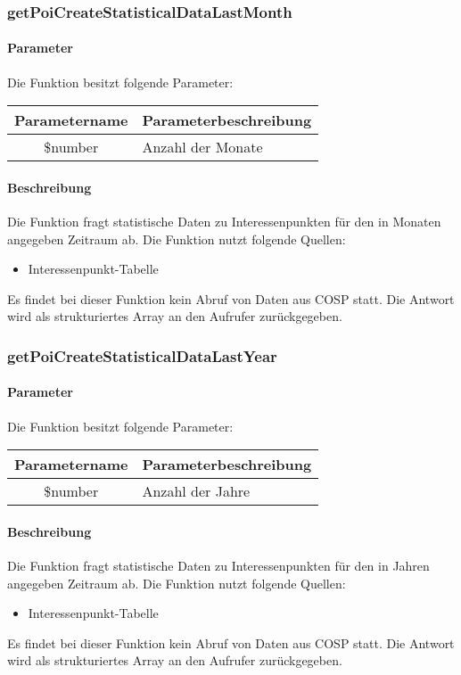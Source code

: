 \subsubsection{getPoiCreateStatisticalDataLastMonth}
\paragraph{Parameter} Die Funktion besitzt folgende Parameter:
\begin{table}[H]
	\begin{tabular}{|c|p{11cm}|}
		\hline
		\textbf{Parametername} & \textbf{Parameterbeschreibung} \\ \hline
		\$number & Anzahl der Monate \\ \hline
	\end{tabular}
\end{table}
\paragraph{Beschreibung} Die Funktion fragt statistische Daten zu Interessenpunkten für den in Monaten angegeben Zeitraum ab. Die Funktion nutzt folgende Quellen:
\begin{itemize}
	\item Interessenpunkt-Tabelle
\end{itemize}
Es findet bei dieser Funktion kein Abruf von Daten aus {\glqq COSP\grqq} statt. Die Antwort wird als strukturiertes Array an den Aufrufer zurückgegeben.
\subsubsection{getPoiCreateStatisticalDataLastYear}
\paragraph{Parameter} Die Funktion besitzt folgende Parameter:
\begin{table}[H]
	\begin{tabular}{|c|p{11cm}|}
		\hline
		\textbf{Parametername} & \textbf{Parameterbeschreibung} \\ \hline
		\$number & Anzahl der Jahre \\ \hline
	\end{tabular}
\end{table}
\paragraph{Beschreibung} Die Funktion fragt statistische Daten zu Interessenpunkten für den in Jahren angegeben Zeitraum ab. Die Funktion nutzt folgende Quellen:
\begin{itemize}
	\item Interessenpunkt-Tabelle
\end{itemize}
Es findet bei dieser Funktion kein Abruf von Daten aus {\glqq COSP\grqq} statt. Die Antwort wird als strukturiertes Array an den Aufrufer zurückgegeben.
